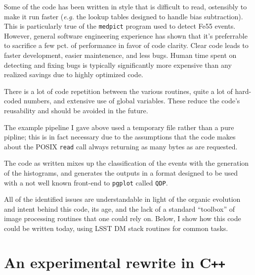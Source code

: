 \documentclass[12pt]{article}
\newcommand{\CPP}{C\texttt{++}\xspace}  %
\begin{document}
Some of the code has been written in style that is difficult to read, ostensibly to
make it run faster (\textit{e.g.} the lookup tables designed to handle bias
subtraction). This is particularly true of the \texttt{medpict} program used to
detect Fe55 events. However, general software engineering experience has shown that it's
preferrable to sacrifice a few pct. of performance in favor of code clarity. Clear code
leads to faster development, easier maintenence, and less bugs. Human time
spent on detecting and fixing bugs is typically significantly more expensive than any 
realized savings due to highly optimized code.

There is a lot of code repetition between the various routines, quite a lot of hard-coded numbers, and
extensive use of global variables. These reduce the code's reusability and
should be avoided in the future.

The example pipeline I gave above used a temporary file rather than a pure pipline; this is in fact necessary
due to the assumptions that the code makes about the POSIX \texttt{read} call always returning as many bytes
as are requested.

The code as written mixes up the classification of the events with the generation of the histograms, and
generates the outputs in a format designed to be used with a not well known front-end to \texttt{pgplot}
called \texttt{QDP}.


All of the identified issues are understandable in light of the organic
evolution and intent behind this code, its age, and the lack of a standard
``toolbox'' of image processing routines that one could rely on.  Below, I
show how this code could be written today, using LSST DM stack routines for
common tasks.

\section{An experimental rewrite in \CPP}
\end{document}
